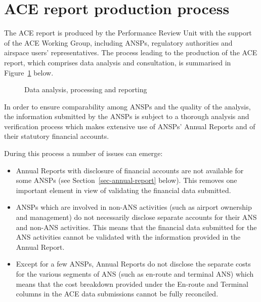 \documentclass[
  11pt,
  a4paperpaper,
  openany,headsepline=on,footsepline=off,DIV=12,table]{scrbook}
\begin{document}
\section{ACE report production
process}\label{ace-report-production-process}

The ACE report is produced by the Performance Review Unit with the
support of the ACE Working Group, including ANSPs, regulatory
authorities and airspace users' representatives. The process leading to
the production of the ACE report, which comprises data analysis and
consultation, is summarised in Figure~\ref{fig-process} below.

\begin{figure}


\caption{\label{fig-process}Data analysis, processing and reporting}

\end{figure}%

In order to ensure comparability among ANSPs and the quality of the
analysis, the information submitted by the ANSPs is subject to a
thorough analysis and verification process which makes extensive use of
ANSPs' Annual Reports and of their statutory financial accounts.

During this process a number of issues can emerge:

\begin{itemize}
\item
  Annual Reports with disclosure of financial accounts are not available
  for some ANSPs (see Section~\ref{sec-annual-report} below). This
  removes one important element in view of validating the financial data
  submitted.
\item
  ANSPs which are involved in non-ANS activities (such as airport
  ownership and management) do not necessarily disclose separate
  accounts for their ANS and non-ANS activities. This means that the
  financial data submitted for the ANS activities cannot be validated
  with the information provided in the Annual Report.
\item
  Except for a few ANSPs, Annual Reports do not disclose the separate
  costs for the various segments of ANS (such as en-route and terminal
  ANS) which means that the cost breakdown provided under the En-route
  and Terminal columns in the ACE data submissions cannot be fully
  reconciled.
\end{itemize}
\end{document}
